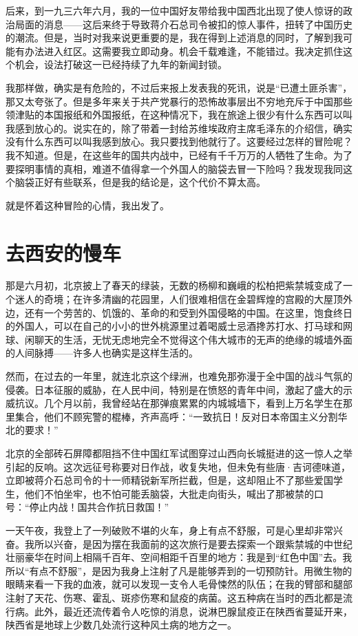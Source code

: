 \documentclass[10pt]{book}
\begin{document}
后来，到一九三六年六月，我的一位中国好友带给我中国西北出现了使人惊讶的政治局面的消息——这后来终于导致蒋介石总司令被扣的惊人事件，扭转了中国历史的潮流。但是，当时对我来说更重要的是，我在得到上述消息的同时，了解到我可能有办法进入红区。这需要我立即动身。机会千载难逢，不能错过。我决定抓住这个机会，设法打破这一已经持续了九年的新闻封锁。

我那样做，确实是有危险的，不过后来报上发表我的死讯，说是“已遭土匪杀害”，那又太夸张了。但是多年来关于共产党暴行的恐怖故事层出不穷地充斥于中国那些领津贴的本国报纸和外国报纸，在这种情况下，我在旅途上很少有什么东西可以叫我感到放心的。说实在的，除了带着一封给苏维埃政府主席毛泽东的介绍信，确实没有什么东西可以叫我感到放心。我只要找到他就行了。这要经过怎样的冒险呢？我不知道。但是，在这些年的国共内战中，已经有千千万万的人牺牲了生命。为了要探明事情的真相，难道不值得拿一个外国人的脑袋去冒一下险吗？我发现我同这个脑袋正好有些联系，但是我的结论是，这个代价不算太高。

就是怀着这种冒险的心情，我出发了。



\section{去西安的慢车}

那是六月初，北京披上了春天的绿装，无数的杨柳和巍峨的松柏把紫禁城变成了一个迷人的奇境；在许多清幽的花园里，人们很难相信在金碧辉煌的宫殿的大屋顶外边，还有一个劳苦的、饥饿的、革命的和受到外国侵略的中国。在这里，饱食终日的外国人，可以在自己的小小的世外桃源里过着喝威士忌酒搀苏打水、打马球和网球、闲聊天的生活，无忧无虑地完全不觉得这个伟大城市的无声的绝缘的城墙外面的人间脉搏——许多人也确实是这样生活的。

然而，在过去的一年里，就连北京这个绿洲，也难免那弥漫于全中国的战斗气氛的侵袭。日本征服的威胁，在人民中间，特别是在愤怒的青年中间，激起了盛大的示威抗议。几个月以前，我曾经站在那弹痕累累的内城城墙下，看到上万名学生在那里集合，他们不顾宪警的棍棒，齐声高呼：“一致抗日！反对日本帝国主义分割华北的要求！”

北京的全部砖石屏障都阻挡不住中国红军试图穿过山西向长城挺进的这一惊人之举引起的反响。这次远征号称要对日作战，收复失地，但未免有些唐·吉诃德味道，立即被蒋介石总司令的十一师精锐新军所拦截，但是，这却阻止不了那些爱国学生，他们不怕坐牢，也不怕可能丢脑袋，大批走向街头，喊出了那被禁的口号：“停止内战！国共合作抗日救国！”

一天午夜，我登上了一列破败不堪的火车，身上有点不舒服，可是心里却非常兴奋。我所以兴奋，是因为摆在我面前的这次旅行是要去探索一个跟紫禁城的中世纪壮丽豪华在时间上相隔千百年、空间相距千百里的地方：我是到“红色中国”去。我所以“有点不舒服”，是因为我身上注射了凡是能够弄到的一切预防针。用微生物的眼睛来看一下我的血液，就可以发现一支令人毛骨悚然的队伍；在我的臂部和腿部注射了天花、伤寒、霍乱、斑疹伤寒和鼠疫的病菌。这五种病在当时的西北都是流行病。此外，最近还流传着令人吃惊的消息，说淋巴腺鼠疫正在陕西省蔓延开来，陕西省是地球上少数几处流行这种风土病的地方之一。
\end{document}
